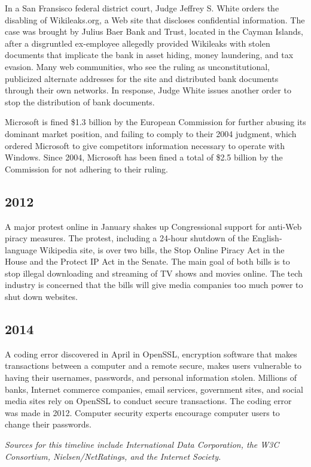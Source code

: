 \documentclass[letterpaper,12pt,english]{sphinxmanual}
\begin{document}
In a San Fransisco federal district court, Judge Jeffrey S. White orders the disabling of Wikileaks.org, a Web site that discloses confidential information. The case was brought by Julius Baer Bank and Trust, located in the Cayman Islands, after a disgruntled ex-employee allegedly provided Wikileaks with stolen documents that implicate the bank in asset hiding, money laundering, and tax evasion. Many web communities, who see the ruling as unconstitutional, publicized alternate addresses for the site and distributed bank documents through their own networks. In response, Judge White issues another order to stop the distribution of bank documents.

Microsoft is fined \$1.3 billion by the European Commission for further abusing its dominant market position, and failing to comply to their 2004 judgment, which ordered Microsoft to give competitors information necessary to operate with Windows. Since 2004, Microsoft has been fined a total of \$2.5 billion by the Commission for not adhering to their ruling.


\subsection{2012}
\label{network-timeline:id28}
A major protest online in January shakes up Congressional support for anti-Web piracy measures. The protest, including a 24-hour shutdown of the English-language Wikipedia site, is over two bills, the Stop Online Piracy Act in the House and the Protect IP Act in the Senate. The main goal of both bills is to stop illegal downloading and streaming of TV shows and movies online. The tech industry is concerned that the bills will give media companies too much power to shut down websites.


\subsection{2014}
\label{network-timeline:id29}
A coding error discovered in April in OpenSSL, encryption software that makes transactions between a computer and a remote secure, makes users vulnerable to having their usernames, passwords, and personal information stolen. Millions of banks, Internet commerce companies, email services, government sites, and social media sites rely on OpenSSL to conduct secure transactions. The coding error was made in 2012. Computer security experts encourage computer users to change their passwords.

\emph{Sources for this timeline include International Data Corporation, the W3C Consortium, Nielsen/NetRatings, and the Internet Society.}
\end{document}
